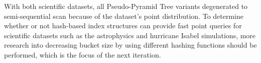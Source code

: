 With both scientific datasets, all Pseudo-Pyramid Tree variants degenerated to semi-sequential scan because of the dataset's point distribution. To determine whether or not hash-based index structures can provide fast point queries for scientific datasets such as the astrophysics and hurricane Isabel simulations, more research into decreasing bucket size by using different hashing functions should be performed, which is the focus of the next iteration.